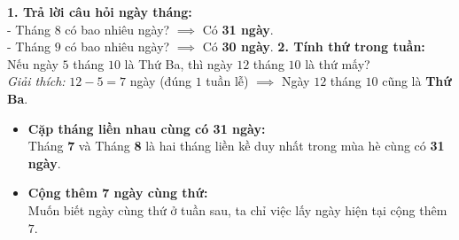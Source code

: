 \documentclass[11pt,a4paper]{article}
\begin{document}
\vspace{-1.5mm}
\noindent
\begin{minipage}[t]{0.49\textwidth}\vspace{0pt}
\begin{tcolorbox}[
  enhanced,
  colback=green!4!white,
  colframe=green!60!black,
  arc=2mm, boxrule=0.8pt,
  left=2mm, right=2mm, top=1.8mm, bottom=1.8mm,
  title={\footnotesize\bfseries\color{white}\faCheckCircle\ 4. Ví dụ thực hành chuẩn mực}
]
{\footnotesize
\textbf{1. Trả lời câu hỏi ngày tháng:}\\
- Tháng $8$ có bao nhiêu ngày? $\implies$ Có \textbf{31 ngày}.\\
- Tháng $9$ có bao nhiêu ngày? $\implies$ Có \textbf{30 ngày}.
\textbf{2. Tính thứ trong tuần:}\\
Nếu ngày $5$ tháng $10$ là Thứ Ba, thì ngày $12$ tháng $10$ là thứ mấy?\\
\textit{Giải thích:} $12 - 5 = 7$ ngày (đúng $1$ tuần lễ) $\implies$ Ngày $12$ tháng $10$ cũng là \textbf{Thứ Ba}.
}
\end{tcolorbox}
\end{minipage}
\hfill
\begin{minipage}[t]{0.49\textwidth}\vspace{0pt}
\begin{tcolorbox}[
  enhanced,
  colback=red!4!white,
  colframe=red!75!black,
  arc=2mm, boxrule=0.8pt,
  left=2mm, right=2mm, top=1.8mm, bottom=1.8mm,
  title={\footnotesize\bfseries\color{white}\faExclamationTriangle\ 5. Mẹo tránh bẫy trắc nghiệm}
]
{\footnotesize
\begin{itemize}\setlength{\itemsep}{1pt}\setlength{\leftskip}{-2.5mm}
  \item \textbf{Cặp tháng liền nhau cùng có 31 ngày:}\\
  Tháng \textbf{7} và Tháng \textbf{8} là hai tháng liền kề duy nhất trong mùa hè cùng có \textbf{31 ngày}.
  \item \textbf{Cộng thêm 7 ngày cùng thứ:}\\
  Muốn biết ngày cùng thứ ở tuần sau, ta chỉ việc lấy ngày hiện tại cộng thêm $7$.
\end{itemize}
}
\end{tcolorbox}
\end{minipage}
\end{document}
